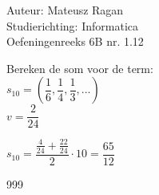 \documentclass[a4paper]{article}
\begin{document}
\noindent \large Auteur: Mateusz Ragan \\
\noindent \large Studierichting: Informatica\\
\noindent \large Oefeningenreeks 6B nr. 1.12\\

\medskip

\normalsize

Bereken de som voor de term:\\

$s_{10} = \left( \dfrac{1}{6},\dfrac{1}{4},\dfrac{1}{3},...\right)$\\

$v = \dfrac{2}{24}$

$s_{10} = \dfrac{\tfrac{4}{24} + \tfrac{22}{24}}{2}\cdot 10 = \dfrac{65}{12}$

\begin{thebibliography}{999}
\end{thebibliography}
\end{document}
